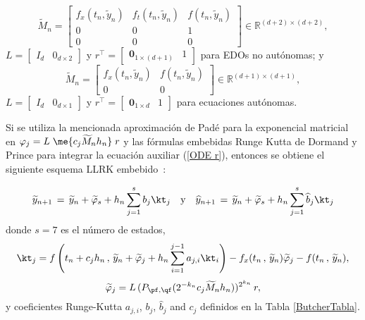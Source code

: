 \begin{equation*}
\widetilde{M}_{n}=\left[ 
\begin{array}{ccc}
f_{x}(t_{n},\widetilde{y}_{n}) &f%
_{t}(t_{n},\widetilde{y}_{n}) & f(t_{n},\widetilde{
		y}_{n}) \\ 
0 & 0 & 1 \\ 
0 & 0 & 0%
\end{array}%
\right] \in \mathbb{R}^{(d+2)\times (d+2)},
\end{equation*}%
$L=\left[ 
\begin{array}{ll}
I_{d} & 0_{d\times 2}%
\end{array}%
\right] $ y $r^{\intercal }=\left[ 
\begin{array}{ll}
\mathbf{0}_{1\times (d+1)} & 1%
\end{array}%
\right] $ para EDOs no aut\'{o}nomas; y 
\begin{equation*}
\widetilde{M}_{n}=\left[ 
\begin{array}{cc}
f_{x}(t_{n},\widetilde{y}_{n}) & f(t_{n},%
\widetilde{y}_{n}) \\ 
0 & 0%
\end{array}%
\right] \in \mathbb{R}^{(d+1)\times (d+1)},
\end{equation*}%
$L=\left[ 
\begin{array}{ll}
I_{d} & 0_{d\times 1}%
\end{array}%
\right] $ y $r^{\intercal }=\left[ 
\begin{array}{ll}
\mathbf{0}_{1\times d} & 1%
\end{array}%
\right] $ para ecuaciones aut\'{o}nomas.

Si se utiliza la mencionada aproximación de Padé para la exponencial matricial en $\varphi_j=L\;\me{c_j\widetilde{M}_{n}h_{n}}\;r$ y las f\'{o}rmulas embebidas Runge Kutta de Dormand y Prince para integrar la ecuaci\'{o}n auxiliar (\ref{ODE r}), entonces se obtiene el siguiente esquema LLRK embebido~\cite{Jimenez14AMC}:

\begin{equation}
\widetilde{y}_{n+1}\,=\,\widetilde{y}_n+\widetilde{\varphi}_s+h_n \sum_{j=1}^{s}b_j \kt_j \quad \text{y} \quad
\widehat{y}_{n+1}\,=\, \widetilde{y}_n+\widetilde{\varphi}_s+h_n \sum_{j=1}^{s}\widehat{b}_j \kt_j
\label{LLDP scheme}
\end{equation}
donde $s = 7$ es el número de estados,
\[ \kt_j = f\left( t_n+c_jh_n\, , \, \widetilde{y}_n+\widetilde{\varphi}_j+h_n \sum_{i=1}^{j-1}a_{j,i}\kt_i \right)  
- f_x(t_n\, , \, \widetilde{y}_n)\widetilde{\varphi}_j - f(t_n\, ,\, \widetilde{y}_n),\]
\[ \widetilde{\varphi }_j =L\,(P_{\pf,\qf}(2^{-k_{n}}c_j\widetilde{M}_{n}h_{n}))^{2^{k_{n}}}\,r, \]
y coeficientes Runge-Kutta $a_{j,i}$, $b_j$, $\hat{b}_j$ and $c_j$ definidos en la Tabla \ref{ButcherTabla}.

